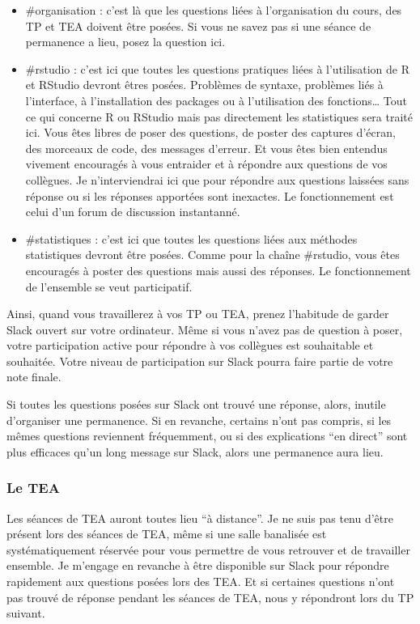 \documentclass[
  a4paper,
]{article}
\providecommand{\tightlist}{%
  \setlength{\itemsep}{0pt}\setlength{\parskip}{0pt}}
\begin{document}
\begin{itemize}
\tightlist
\item
  \#organisation : c'est là que les questions liées à l'organisation du cours, des TP et TEA doivent être posées. Si vous ne savez pas si une séance de permanence a lieu, posez la question ici.
\item
  \#rstudio : c'est ici que toutes les questions pratiques liées à l'utilisation de R et RStudio devront êtres posées. Problèmes de syntaxe, problèmes liés à l'interface, à l'installation des packages ou à l'utilisation des fonctions\ldots{} Tout ce qui concerne R ou RStudio mais pas directement les statistiques sera traité ici. Vous êtes libres de poser des questions, de poster des captures d'écran, des morceaux de code, des messages d'erreur. Et vous êtes bien entendus vivement encouragés à vous entraider et à répondre aux questions de vos collègues. Je n'interviendrai ici que pour répondre aux questions laissées sans réponse ou si les réponses apportées sont inexactes. Le fonctionnement est celui d'un forum de discussion instantanné.
\item
  \#statistiques : c'est ici que toutes les questions liées aux méthodes statistiques devront être posées. Comme pour la chaîne \#rstudio, vous êtes encouragés à poster des questions mais aussi des réponses. Le fonctionnement de l'ensemble se veut participatif.
\end{itemize}

Ainsi, quand vous travaillerez à vos TP ou TEA, prenez l'habitude de garder Slack ouvert sur votre ordinateur. Même si vous n'avez pas de question à poser, votre participation active pour répondre à vos collègues est souhaitable et souhaitée. Votre niveau de participation sur Slack pourra faire partie de votre note finale.

Si toutes les questions posées sur Slack ont trouvé une réponse, alors, inutile d'organiser une permanence. Si en revanche, certains n'ont pas compris, si les mêmes questions reviennent fréquemment, ou si des explications ``en direct'' sont plus efficaces qu'un long message sur Slack, alors une permanence aura lieu.

\hypertarget{le-tea}{%
\subsubsection{Le TEA}\label{le-tea}}

Les séances de TEA auront toutes lieu ``à distance''. Je ne suis pas tenu d'être présent lors des séances de TEA, même si une salle banalisée est systématiquement réservée pour vous permettre de vous retrouver et de travailler ensemble. Je m'engage en revanche à être disponible sur Slack pour répondre rapidement aux questions posées lors des TEA. Et si certaines questions n'ont pas trouvé de réponse pendant les séances de TEA, nous y répondront lors du TP suivant.
\end{document}
